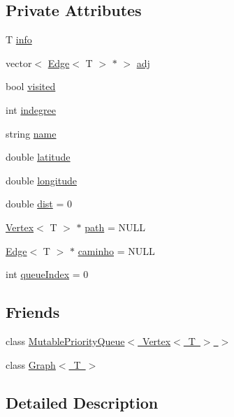 \subsection*{Private Attributes}
\begin{DoxyCompactItemize}
\item 
T \mbox{\hyperlink{class_vertex_a415d7811eef6cdd992f0dca1f35a49cd}{info}}
\item 
vector$<$ \mbox{\hyperlink{class_edge}{Edge}}$<$ T $>$ $\ast$ $>$ \mbox{\hyperlink{class_vertex_a3a5e3cdc85b3d338a5661cb5b55de729}{adj}}
\item 
bool \mbox{\hyperlink{class_vertex_a187a2fe4ff50261cf3c15b8cda7dfc56}{visited}}
\item 
int \mbox{\hyperlink{class_vertex_ab29ac1b694fc673ba26cfc6d3e9bda13}{indegree}}
\item 
string \mbox{\hyperlink{class_vertex_a1990577b54c37df981c81eac40c4af71}{name}}
\item 
double \mbox{\hyperlink{class_vertex_a960be3c1167e82abe7fcb81178674e5e}{latitude}}
\item 
double \mbox{\hyperlink{class_vertex_a830e29c233af0899c087d9873864c477}{longitude}}
\item 
double \mbox{\hyperlink{class_vertex_a08a2b813e77f97aa8b6c1d252e5417f7}{dist}} = 0
\item 
\mbox{\hyperlink{class_vertex}{Vertex}}$<$ T $>$ $\ast$ \mbox{\hyperlink{class_vertex_ab968bdd80f912a6f21f30e479bf735ce}{path}} = N\+U\+LL
\item 
\mbox{\hyperlink{class_edge}{Edge}}$<$ T $>$ $\ast$ \mbox{\hyperlink{class_vertex_adb879f0355fa2d27be89fe9286fdfd4a}{caminho}} = N\+U\+LL
\item 
int \mbox{\hyperlink{class_vertex_a721ab622207a73c5fae7b9abad6c07cc}{queue\+Index}} = 0
\end{DoxyCompactItemize}
\subsection*{Friends}
\begin{DoxyCompactItemize}
\item 
class \mbox{\hyperlink{class_vertex_ae53e0b4fec14b9f1eaa8a4f8cd426e9e}{Mutable\+Priority\+Queue$<$ Vertex$<$ T $>$ $>$}}
\item 
class \mbox{\hyperlink{class_vertex_aefa9b76cd57411c5354e5620dc2d84dd}{Graph$<$ T $>$}}
\end{DoxyCompactItemize}


\subsection{Detailed Description}
